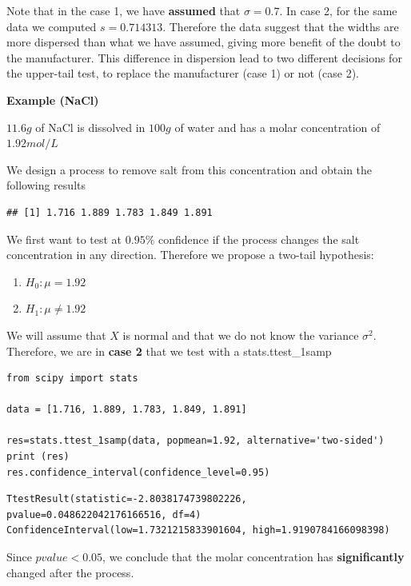 \documentclass[
]{book}
\providecommand{\tightlist}{%
  \setlength{\itemsep}{0pt}\setlength{\parskip}{0pt}}
\begin{document}
Note that in the case 1, we have \textbf{assumed} that \(\sigma=0.7\). In case 2, for the same data we computed \(s=0.714313\). Therefore the data suggest that the widths are more dispersed than what we have assumed, giving more benefit of the doubt to the manufacturer. This difference in dispersion lead to two different decisions for the upper-tail test, to replace the manufacturer (case 1) or not (case 2).

\textbf{Example (NaCl)}

\(11.6g\) of NaCl is dissolved in \(100 g\) of water and has a molar concentration of \(1.92 mol/L\)

We design a process to remove salt from this concentration and obtain the following results

\begin{verbatim}
## [1] 1.716 1.889 1.783 1.849 1.891
\end{verbatim}

We first want to test at \(0.95\%\) confidence if the process changes the salt concentration in any direction. Therefore we propose a two-tail hypothesis:

\begin{enumerate}
\def\labelenumi{\alph{enumi}.}
\tightlist
\item
  \(H_0:\mu=1.92\)
\item
  \(H_1:\mu \neq 1.92\)
\end{enumerate}

We will assume that \(X\) is normal and that we do not know the variance \(\sigma^2\). Therefore, we are in \textbf{case 2} that we test with a stats.ttest\_1samp

\begin{verbatim}
from scipy import stats

data = [1.716, 1.889, 1.783, 1.849, 1.891]

res=stats.ttest_1samp(data, popmean=1.92, alternative='two-sided')
print (res)
res.confidence_interval(confidence_level=0.95)
\end{verbatim}

\begin{verbatim}
TtestResult(statistic=-2.8038174739802226, pvalue=0.048622042176166516, df=4)
ConfidenceInterval(low=1.7321215833901604, high=1.9190784166098398)
\end{verbatim}

Since \(pvalue <0.05\), we conclude that the molar concentration has \textbf{significantly} changed after the process.
\end{document}
